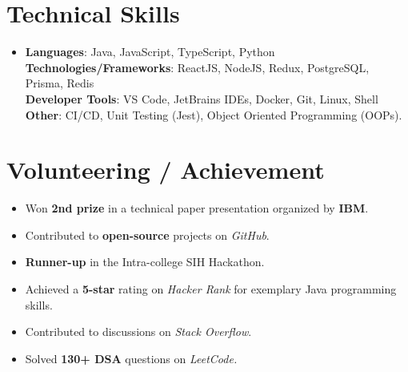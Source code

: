 \documentclass[letterpaper,11pt]{article}
\newcommand{\resumeItem}[1]{
  \item\small{
    {#1 \vspace{-2pt}}
  }
}
\newcommand{\resumeItemListStart}{\begin{itemize}}
\newcommand{\resumeItemListEnd}{\end{itemize}\vspace{-5pt}}
\begin{document}
\section{Technical Skills}
 \vspace{5pt}
 \begin{itemize}[leftmargin=0.15in, label={}]
    \item{
     \textbf{Languages}{: Java, JavaScript, TypeScript, Python} \\
     \vspace{4pt}
     \textbf{Technologies/Frameworks}{: ReactJS, NodeJS, Redux, PostgreSQL, Prisma, Redis} \\
     \vspace{4pt}
     \textbf{Developer Tools}{: VS Code, JetBrains IDEs, Docker, Git, Linux, Shell} \\
     \vspace{4pt}
     \textbf{Other}{: CI/CD, Unit Testing (Jest), Object Oriented Programming (OOPs).} \\
    }
 \end{itemize}
 \vspace{-10pt}



\section{Volunteering / Achievement}
 \vspace{5pt}
    \resumeItemListStart
        \resumeItem{Won \textbf{2nd prize} in a technical paper presentation organized by \textbf{IBM}.}
        \resumeItem{Contributed to \textbf{open-source} projects on \textit{GitHub}.}
        \resumeItem{ \textbf{Runner-up} in the Intra-college SIH Hackathon.}
        \resumeItem{Achieved a \textbf{5-star} rating on \textit{Hacker Rank} for exemplary Java programming skills.}
        \resumeItem{Contributed to discussions on \textit{Stack Overflow}.}
        \resumeItem{Solved \textbf{130+ DSA} questions on \textit{LeetCode.}}
    \resumeItemListEnd
\end{document}
